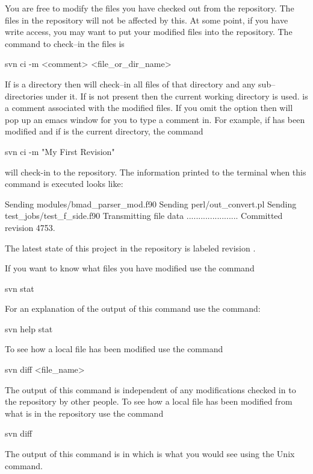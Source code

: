You are free to modify the files you have checked out from the
repository. The files in the repository will not be affected by this.
At some point, if you have write access, 
you may want to put your modified files into the
repository. The command to check--in the files is
\begin{example}
  svn ci -m <comment> <file_or_dir_name>
\end{example}
If  is a directory then \svn will check--in all
files of that directory and any sub--directories under it. If
 is not present then the current working
directory is used.  is a comment associated with the
modified files. If you omit the  option then \svn
will pop up an emacs window for you to type a comment in.
For example, if  has been modified
and if  is the current directory, the command
\begin{example}
  svn ci -m "My First Revision"
\end{example}
will check-in  to the repository. The information printed to
the terminal when this command is executed looks like:
\begin{example}
  Sending        modules/bmad_parser_mod.f90
  Sending        perl/out_convert.pl
  Sending        test_jobs/test_f_side.f90
  Transmitting file data ......................
  Committed revision 4753.
\end{example}
The latest state of this project in the repository is labeled 
revision .

If you want to know what files you have modified use the command
\begin{example}
  svn stat
\end{example}
For an explanation of the output of this command use the command:
\begin{example}
  svn help stat
\end{example}

To see how a local file has been modified 
use the command
\begin{example}
  svn diff <file_name>
\end{example}
The output of this command is independent of any modifications checked in
to the repository by other people.
To see how a local file has been modified from what is in the repository use the
command
\begin{example}
  svn diff
\end{example}
The output of this command is in  which is what you
would see using the Unix  command.


